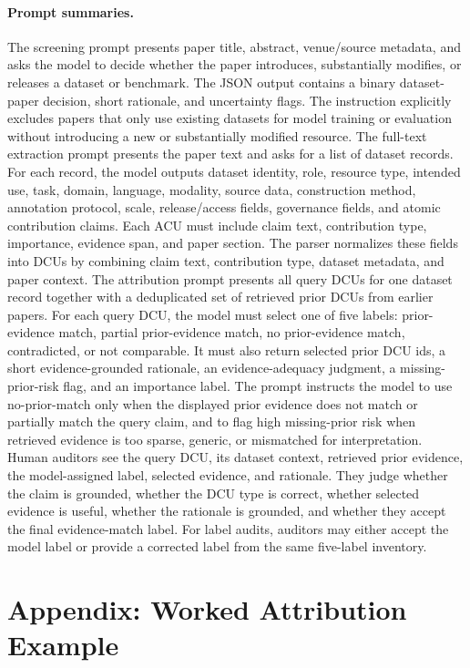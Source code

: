 \documentclass[11pt]{article}
\begin{document}
\paragraph{Prompt summaries.}
The screening prompt presents paper title, abstract, venue/source metadata, and asks the model to decide whether the paper introduces, substantially modifies, or releases a dataset or benchmark.
The JSON output contains a binary dataset-paper decision, short rationale, and uncertainty flags.
The instruction explicitly excludes papers that only use existing datasets for model training or evaluation without introducing a new or substantially modified resource.
The full-text extraction prompt presents the paper text and asks for a list of dataset records.
For each record, the model outputs dataset identity, role, resource type, intended use, task, domain, language, modality, source data, construction method, annotation protocol, scale, release/access fields, governance fields, and atomic contribution claims.
Each ACU must include claim text, contribution type, importance, evidence span, and paper section.
The parser normalizes these fields into DCUs by combining claim text, contribution type, dataset metadata, and paper context.
The attribution prompt presents all query DCUs for one dataset record together with a deduplicated set of retrieved prior DCUs from earlier papers.
For each query DCU, the model must select one of five labels: prior-evidence match, partial prior-evidence match, no prior-evidence match, contradicted, or not comparable.
It must also return selected prior DCU ids, a short evidence-grounded rationale, an evidence-adequacy judgment, a missing-prior-risk flag, and an importance label.
The prompt instructs the model to use no-prior-match only when the displayed prior evidence does not match or partially match the query claim, and to flag high missing-prior risk when retrieved evidence is too sparse, generic, or mismatched for interpretation.
Human auditors see the query DCU, its dataset context, retrieved prior evidence, the model-assigned label, selected evidence, and rationale.
They judge whether the claim is grounded, whether the DCU type is correct, whether selected evidence is useful, whether the rationale is grounded, and whether they accept the final evidence-match label.
For label audits, auditors may either accept the model label or provide a corrected label from the same five-label inventory.

\section{Appendix: Worked Attribution Example}
\label{app:worked_example}
\end{document}
